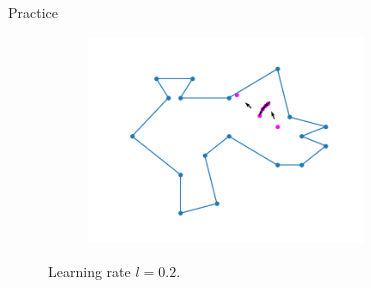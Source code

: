 \documentclass{beamer}
\begin{document}
\begin{frame}{Practice}
\begin{figure}[h!]
\begin{subfigure}{0.4\textwidth}
			\caption{}
			\label{fig:comb_gradient}
		\end{subfigure}
		\begin{subfigure}{0.4\textwidth}
			\centering
			\includegraphics[width = 0.8\textwidth]{Images/random_gradient.png}
			\caption{}
			\label{fig:random_gradient}
		\end{subfigure}
		\caption{Learning rate $l = 0.2$.}
		\label{fig:gradients}
	\end{figure}
\end{frame}

\end{document}
